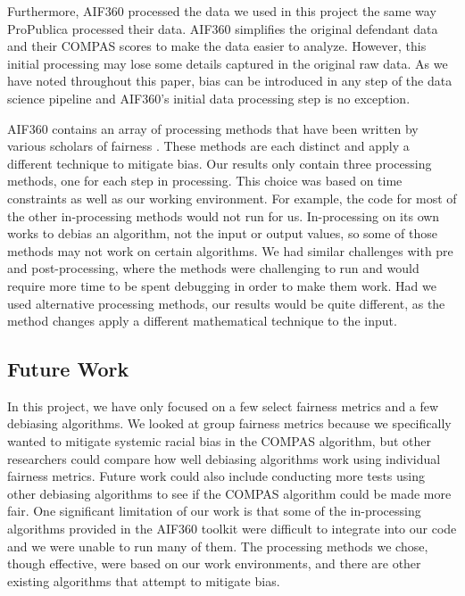 \documentclass[water,article,submit,moreauthors,pdftex]{mdpi}
\begin{document}
Furthermore, AIF360 processed the data we used in this project the same
way ProPublica processed their data. AIF360 simplifies the original
defendant data and their COMPAS scores to make the data easier to
analyze. However, this initial processing may lose some details captured
in the original raw data. As we have noted throughout this paper, bias
can be introduced in any step of the data science pipeline and AIF360's
initial data processing step is no exception.

AIF360 contains an array of processing methods that have been written by
various scholars of fairness \citep{aif360-oct-2018}. These methods are
each distinct and apply a different technique to mitigate bias. Our
results only contain three processing methods, one for each step in
processing. This choice was based on time constraints as well as our
working environment. For example, the code for most of the other
in-processing methods would not run for us. In-processing on its own
works to debias an algorithm, not the input or output values, so some of
those methods may not work on certain algorithms. We had similar
challenges with pre and post-processing, where the methods were
challenging to run and would require more time to be spent debugging in
order to make them work. Had we used alternative processing methods, our
results would be quite different, as the method changes apply a
different mathematical technique to the input.

\hypertarget{future-work}{%
\subsection{Future Work}\label{future-work}}

In this project, we have only focused on a few select fairness metrics
and a few debiasing algorithms. We looked at group fairness metrics
because we specifically wanted to mitigate systemic racial bias in the
COMPAS algorithm, but other researchers could compare how well debiasing
algorithms work using individual fairness metrics. Future work could
also include conducting more tests using other debiasing algorithms to
see if the COMPAS algorithm could be made more fair. One significant
limitation of our work is that some of the in-processing algorithms
provided in the AIF360 toolkit were difficult to integrate into our code
and we were unable to run many of them. The processing methods we chose,
though effective, were based on our work environments, and there are
other existing algorithms that attempt to mitigate bias.
\end{document}
